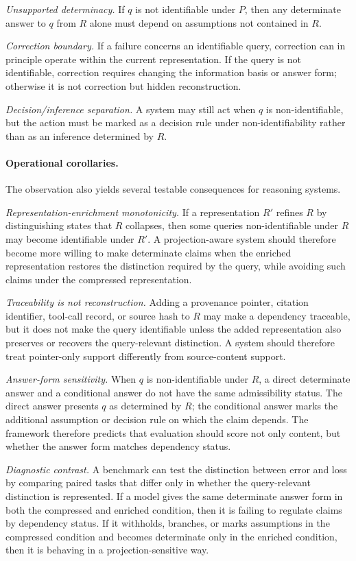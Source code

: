 \documentclass[11pt]{article}
\begin{document}
\emph{Unsupported determinacy.}
If $q$ is not identifiable under $P$, then any determinate answer to $q$ from $R$ alone must depend on assumptions not contained in $R$.

\emph{Correction boundary.}
If a failure concerns an identifiable query, correction can in principle operate within the current representation. If the query is not identifiable, correction requires changing the information basis or answer form; otherwise it is not correction but hidden reconstruction.

\emph{Decision/inference separation.}
A system may still act when $q$ is non-identifiable, but the action must be marked as a decision rule under non-identifiability rather than as an inference determined by $R$.

\paragraph{Operational corollaries.}
The observation also yields several testable consequences for reasoning systems.

\emph{Representation-enrichment monotonicity.}
If a representation $R'$ refines $R$ by distinguishing states that $R$ collapses, then some queries non-identifiable under $R$ may become identifiable under $R'$. A projection-aware system should therefore become more willing to make determinate claims when the enriched representation restores the distinction required by the query, while avoiding such claims under the compressed representation.

\emph{Traceability is not reconstruction.}
Adding a provenance pointer, citation identifier, tool-call record, or source hash to $R$ may make a dependency traceable, but it does not make the query identifiable unless the added representation also preserves or recovers the query-relevant distinction. A system should therefore treat pointer-only support differently from source-content support.

\emph{Answer-form sensitivity.}
When $q$ is non-identifiable under $R$, a direct determinate answer and a conditional answer do not have the same admissibility status. The direct answer presents $q$ as determined by $R$; the conditional answer marks the additional assumption or decision rule on which the claim depends. The framework therefore predicts that evaluation should score not only content, but whether the answer form matches dependency status.

\emph{Diagnostic contrast.}
A benchmark can test the distinction between error and loss by comparing paired tasks that differ only in whether the query-relevant distinction is represented. If a model gives the same determinate answer form in both the compressed and enriched condition, then it is failing to regulate claims by dependency status. If it withholds, branches, or marks assumptions in the compressed condition and becomes determinate only in the enriched condition, then it is behaving in a projection-sensitive way.
\end{document}
